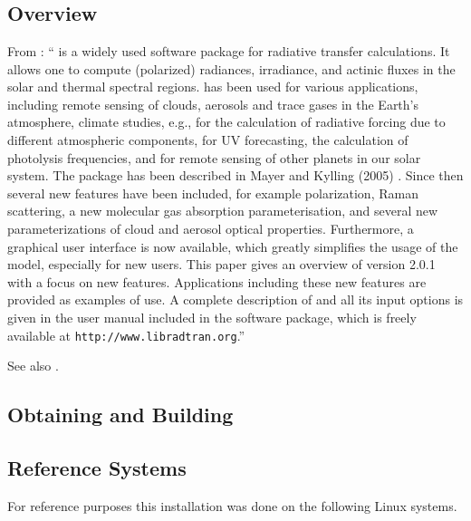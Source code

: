 

\chapter{\libradtran{}}
\label{chap:libRadtran}


\section{\libradtran{} Overview}

From \cite{EmdeLibRadtran2016}:
``\libradtran{} is a widely used software package for
radiative transfer calculations. It allows one to compute (polarized) radiances, irradiance, and actinic fluxes in the solar and thermal spectral regions. \libradtran{} has been used
for various applications, including remote sensing of clouds,
aerosols and trace gases in the Earth's atmosphere, climate
studies, e.g., for the calculation of radiative forcing due to
different atmospheric components, for UV forecasting, the
calculation of photolysis frequencies, and for remote sensing
of other planets in our solar system. The package has been
described in Mayer and Kylling (2005) \cite{libRadtran2005}. Since then several
new features have been included, for example polarization,
Raman scattering, a new molecular gas absorption parameterisation, and several new parameterizations of cloud and
aerosol optical properties. Furthermore, a graphical user interface is now available, which greatly simplifies the usage
of the model, especially for new users. This paper gives an
overview of \libradtran{} version 2.0.1 with a focus on new features. Applications including these new features are provided
as examples of use. A complete description of \libradtran{} and
all its input options is given in the user manual included in
the \libradtran{} software package, which is freely available at
\lstinline{http://www.libradtran.org}.''

See also 
\cite{libRadtran2005,libRadTranUserGuide2012,libRadtranDownload2020,libRadtranmuenchen2020}.


\section{Obtaining and Building \libradtran{}}

\section{Reference Systems}
For reference purposes this installation was done on the following Linux systems.

